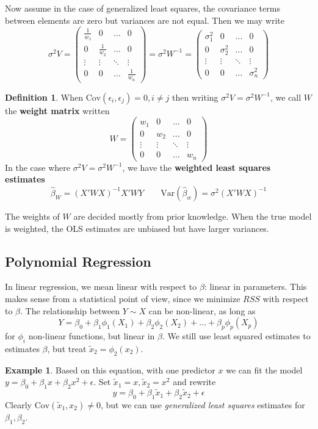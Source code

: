 \documentclass[12pt, a4paper]{article}
\theoremstyle{definition}
\newtheorem{definition}{Definition}
\newtheorem{example}{Example}
\newcommand{\eps}{\epsilon}
\newcommand{\f}{\frac}
\newcommand{\Cov}{\mathrm{Cov}}
\newcommand{\pmat}[1]{\begin{pmatrix}#1\end{pmatrix}}
\begin{document}
	Now assume in the case of generalized least squares, the covariance terms between elements are zero but variances are not equal. Then we may write
	$$
		\sigma^2V = \pmat{\f1{w_1} & 0 & \hdots & 0\\
						  0 & \f1{w_2} & \hdots & 0	\\
					  	  \vdots & \vdots & \ddots & \vdots	\\
				  	  		0 & 0 & \hdots & \f1{w_n}}
			  	  = \sigma^2W^{-1} 
			  	  =  \pmat{\sigma_1^2 & 0 & \hdots & 0\\
			  	  	0 & \sigma_2^2 & \hdots & 0	\\
			  	  	\vdots & \vdots & \ddots & \vdots	\\
			  	  	0 & 0 & \hdots & \sigma_n^2}
	$$
	\begin{definition}
		When $\Cov(\eps_i, \eps_j) = 0, i \neq j$ then writing $\sigma^2V = \sigma^2W^{-1}$, we call $W$ the {\bf weight matrix} written
		$$ W =\pmat{{w_1} & 0 & \hdots & 0\\
			0 & {w_2} & \hdots & 0	\\
			\vdots & \vdots & \ddots & \vdots	\\
			0 & 0 & \hdots & {w_n}}$$
		In the case where $\sigma^2V = \sigma^2W^{-1}$, we have the {\bf weighted least squares estimates}
		$$
			\hat \beta_W = (X'WX)^{-1} X'WY	\qquad \text{Var}(\hat \beta_w) = \sigma^2 (X'WX)^{-1}
		$$
	\end{definition}
	The weights of $W$ are decided mostly from prior knowledge. When the true model is weighted, the OLS estimates are unbiased but have larger variances. 
	
	\subsection{Polynomial Regression}
	
	In linear regression, we mean linear with respect to $\beta$: linear in parameters. This makes sense from a statistical point of view, since we minimize $RSS$ with respect to $\beta$. The relationship between $Y \sim X$ can be non-linear, as long as
	$$
		Y = \beta_0 + \beta_1 \phi_1(X_1) + \beta_2 \phi_2(X_2) + \ldots + \beta_p\phi_p(X_p)
	$$
	for $\phi_i$ non-linear functions, but linear in $\beta$. We still use least squared estimates to estimates $\beta$, but treat $\tilde x_2 = \phi_2 (x_2)$.
	\begin{example}
		Based on this equation, with one predictor $x$ we can fit the model $y = \beta_0 + \beta_1 x + \beta_2 x^2 + \eps$. Set $\tilde x_1 = x, \tilde x_2 = x^2$ and rewrite
		$$
			y = \beta_0 + \beta_1 \tilde x_1 + \beta_2 \tilde x_2 + \eps
		$$
		Clearly $\Cov(\tilde x_1, x_2) \neq 0$, but we can use \textit{generalized least squares} estimates for $\beta_1, \beta_2$.
	\end{example}
	
\end{document}
